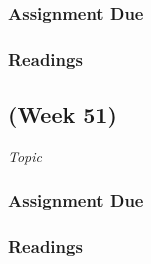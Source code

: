 \documentclass[12pt,a4paper]{article}
\begin{document}
\subsubsection*{Assignment Due}

\subsubsection*{Readings}


\clearpage
\subsection{ (Week 51)}
\emph{Topic}
\vspace{1em}
\subsubsection*{Assignment Due}

\subsubsection*{Readings}




\end{document}
